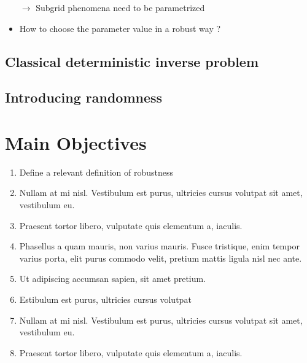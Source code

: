 \documentclass[a0,portrait, 30pt]{a0poster}
\begin{document}
\begin{minipage}{0.48\linewidth}
\begin{itemize}
  $\rightarrow$ Subgrid phenomena need to be parametrized
\item How to choose the parameter value in a robust way ?
\end{itemize}
\subsection*{Classical deterministic inverse problem}
\begin{center}
  
\end{center}
\subsection*{Introducing randomness}
\begin{center}
  
\end{center}

\color{DarkSlateGray} %

\section*{Main Objectives}

\begin{enumerate}
\item Define a relevant definition of robustness
\item Nullam at mi nisl. Vestibulum est purus, ultricies cursus volutpat sit amet, vestibulum eu.
\item Praesent tortor libero, vulputate quis elementum a, iaculis.
\item Phasellus a quam mauris, non varius mauris. Fusce tristique, enim tempor varius porta, elit purus commodo velit, pretium mattis ligula nisl nec ante.
\item Ut adipiscing accumsan sapien, sit amet pretium.
\item Estibulum est purus, ultricies cursus volutpat
\item Nullam at mi nisl. Vestibulum est purus, ultricies cursus volutpat sit amet, vestibulum eu.
\item Praesent tortor libero, vulputate quis elementum a, iaculis.
\end{enumerate}


\end{minipage}
\end{document}
